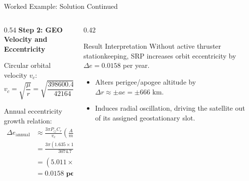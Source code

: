 \documentclass[aspectratio=169,11pt]{beamer}
\begin{document}
\begin{frame}{Worked Example: Solution Continued}
    \begin{columns}[t]
        \begin{column}{0.54\textwidth}
            \textbf{Step 2: GEO Velocity and Eccentricity}
            
            \smallskip
            \small
            Circular orbital velocity $v_c$:
            \begin{equation*}
                v_c = \sqrt{\frac{\mu}{r}} = \sqrt{\frac{398600.44}{42164}} = 3074.7\text{ m/s}
            \end{equation*}

            Annual eccentricity growth relation:
            \begin{align*}
                \Delta e_{\text{annual}} &\approx \frac{3\pi P_{\odot} C_r}{v_c} \left(\frac{A}{m}\right) = \frac{3\pi a_{\text{srp}}}{v_c} T_{\text{year}} \\[3pt]
                &= \frac{3\pi (1.635 \times 10^{-7})}{3074.7} (3.1557 \times 10^7) \\[3pt]
                &= (5.011 \times 10^{-10}) (3.1557 \times 10^7) \\[3pt]
                &= \mathbf{0.0158\text{ per year}}
            \end{align*}
        \end{column}

        \begin{column}{0.42\textwidth}
            \begin{block}{Result Interpretation}
                \small
                Without active thruster stationkeeping, SRP increases orbit eccentricity by $\Delta e = 0.0158$ per year.
            \end{block}

            \small
            \begin{itemize}
                \item Alters perigee/apogee altitude by $\Delta r \approx \pm a e = \pm 666\text{ km}$.
                \item Induces radial oscillation, driving the satellite out of its assigned geostationary slot.
            \end{itemize}
        \end{column}
    \end{columns}
\end{frame}
\end{document}
